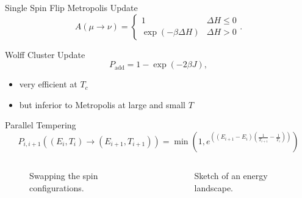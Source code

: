 \documentclass{beamer}
\newcommand{\brac}[1]{\ensuremath{\left(#1\right)}}
\begin{document}
        \begin{frame}{Single Spin Flip Metropolis Update \cite{Metropolis1953}}
            \begin{equation}
                A(\mu \to \nu) =
                \begin{cases}
                    1                            & \Delta H \le 0 \\
                    \exp{\brac{-\beta \Delta H}} & \Delta H > 0
                \end{cases}.
            \end{equation}
        \end{frame}

        \begin{frame}{Wolff Cluster Update \cite{Wolff1989}}
            \begin{equation}
                P_{\mathrm{add}} = 1-\exp\brac{-2\beta J},
            \end{equation}
            \pause
            \begin{itemize}[<+->]
                \item very efficient at \(T_{c}\)
                \item but inferior to Metropolis at large and small \(T\)
            \end{itemize}
        \end{frame}

        \begin{frame}{Parallel Tempering \cite{ParallelTempering1986}}
            \begin{equation}
                P_{i,i+1}((E_i,T_i) \to (E_{i+1},T_{i+1})) = \min\brac{1,e^{\brac{\brac{E_{i+1}-E_i}\brac{\frac{1}{T_{i+1}}-\frac{1}{T_i}}}}}
            \end{equation}
            \begin{columns}[b]
                \begin{column}{5cm}
                    \begin{figure}[htbp]
                        \centering
                        
                        \caption
                        {
                            Swapping the spin configurations.
                        }
                    \end{figure}
                \end{column}
                \pause
                \begin{column}{6cm}
                    \begin{figure}[htbp]
                        \centering
                        
                        \caption
                        {
                            Sketch of an energy landscape.
                        }
                    \end{figure}
                \end{column}
            \end{columns}
        \end{frame}
\end{document}
